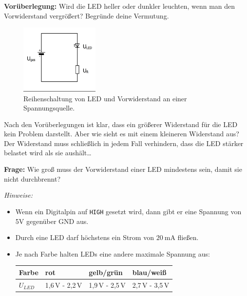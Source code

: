 \textbf{Vorüberlegung:} Wird die LED heller oder dunkler leuchten, wenn man den Vorwiderstand vergrößert? Begründe deine Vermutung.

\begin{figure}[H]
	\centering
	\includegraphics[width=0.35\textwidth]{./Zeichnungen/ReiheLEDWiderstand.png}
	\caption{Reihenschaltung von LED und Vorwiderstand an einer Spannungsquelle.}
	\label{abb:reiheledwiderstand}
\end{figure}

Nach den Vorüberlegungen ist klar, dass ein größerer Widerstand für die LED kein Problem darstellt. Aber wie sieht es mit einem kleineren Widerstand aus? Der Widerstand muss schließlich in jedem Fall verhindern, dass die LED stärker belastet wird als sie aushält\dots

\begin{ziel}
	\textbf{Frage:} Wie groß muss der Vorwiderstand einer LED mindestens sein, damit sie nicht durchbrennt?
\end{ziel}

\emph{Hinweise:}
\begin{itemize}[itemsep=0mm,parsep=0mm]
	\item Wenn ein Digitalpin auf \texttt{HIGH} gesetzt wird, dann gibt er eine Spannung von 5V gegenüber GND aus.
	\item Durch eine LED darf höchstens ein Strom von $\SI{20}{\milli\ampere}$ fließen.
	\item Je nach Farbe halten LEDs eine andere maximale Spannung aus:
	
	\begin{tabular}{l|l|l|l}
		Farbe & rot & gelb/grün & blau/weiß \\ \hline
		$U_{LED}$ & 1,6\,V - 2,2\,V & 1,9\,V - 2,5\,V & 2,7\,V - 3,5\,V \\
	\end{tabular}
\end{itemize}

